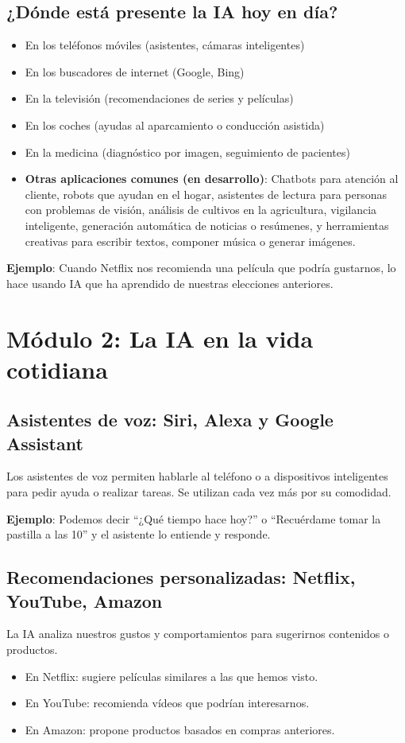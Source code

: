 \documentclass[12pt]{article}
\begin{document}
	\subsection*{¿Dónde está presente la IA hoy en día?}
	\begin{itemize}
		\item En los teléfonos móviles (asistentes, cámaras inteligentes)
		\item En los buscadores de internet (Google, Bing)
		\item En la televisión (recomendaciones de series y películas)
		\item En los coches (ayudas al aparcamiento o conducción asistida)
		\item En la medicina (diagnóstico por imagen, seguimiento de pacientes)
		\item \textbf{Otras aplicaciones comunes (en desarrollo)}: Chatbots para atención al cliente, robots que ayudan en el hogar, asistentes de lectura para personas con problemas de visión, análisis de cultivos en la agricultura, vigilancia inteligente, generación automática de noticias o resúmenes, y herramientas creativas para escribir textos, componer música o generar imágenes.
	\end{itemize}
	
	\textbf{Ejemplo}: Cuando Netflix nos recomienda una película que podría gustarnos, lo hace usando IA que ha aprendido de nuestras elecciones anteriores.
	
	\newpage
	
	\section{\textbf{\normalsize Módulo 2: La IA en la vida cotidiana}}
	
	\subsection*{Asistentes de voz: Siri, Alexa y Google Assistant}
	Los asistentes de voz permiten hablarle al teléfono o a dispositivos inteligentes para pedir ayuda o realizar tareas. Se utilizan cada vez más por su comodidad.
	
	\textbf{Ejemplo}: Podemos decir “¿Qué tiempo hace hoy?” o “Recuérdame tomar la pastilla a las 10” y el asistente lo entiende y responde.
	
	\subsection*{Recomendaciones personalizadas: Netflix, YouTube, Amazon}
	La IA analiza nuestros gustos y comportamientos para sugerirnos contenidos o productos.
	\begin{itemize}
		\item En Netflix: sugiere películas similares a las que hemos visto.
		\item En YouTube: recomienda vídeos que podrían interesarnos.
		\item En Amazon: propone productos basados en compras anteriores.
	\end{itemize}
	
\end{document}
